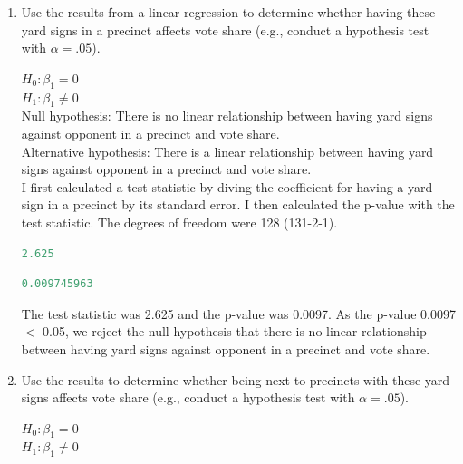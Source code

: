 \documentclass[12pt,letterpaper]{article}
\begin{document}
\begin{enumerate}
	\item [(a)] Use the results from a linear regression to determine whether having these yard signs in a precinct affects vote share (e.g., conduct a hypothesis test with $\alpha = .05$).
	
	\noindent $H_0: \beta_1 = 0 $ \\
	\noindent $H_1: \beta_1 \neq 0 $ \\
	
	\noindent Null hypothesis: There is no linear relationship between having yard signs against opponent in a precinct and vote share. \\
	\noindent Alternative hypothesis: There is a linear relationship between having yard signs against opponent in a precinct and vote share. \\
	
	\noindent I first calculated a test statistic by diving the coefficient for having a yard sign in a precinct by its standard error. I then calculated the p-value with the test statistic. The degrees of freedom were 128 (131-2-1). \\
	
	
	
	\begin{lstlisting}[language=R]
		2.625	\end{lstlisting}
	
	
	
	\begin{lstlisting}[language=R]
	0.009745963	\end{lstlisting}
	
	\noindent The test statistic was 2.625 and the p-value was 0.0097. As the p-value 0.0097 $<$ 0.05, we reject the null hypothesis that there is no linear relationship between having yard signs against opponent in a precinct and vote share.  \\
		
	\item [(b)]  Use the results to determine whether being
	next to precincts with these yard signs affects vote
	share (e.g., conduct a hypothesis test with $\alpha = .05$).
	
	\noindent $H_0: \beta_1 = 0 $ \\
	\noindent $H_1: \beta_1 \neq 0 $ \\
	

\end{enumerate}
\end{document}
